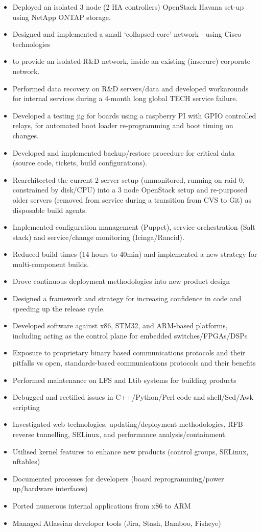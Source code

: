 \begin{itemize}
\itemsep1pt\parskip0pt
\item
  Deployed an isolated 3 node (2 HA controllers) OpenStack Havana set-up
  using NetApp ONTAP storage.
\item
  Designed and implemented a small `collapsed-core' network - using
  Cisco technologies
\item
  to provide an isolated R\&D network, inside an existing (insecure)
  corporate network.
\item
  Performed data recovery on R\&D servers/data and developed workarounds
  for internal services during a 4-month long global TECH service
  failure.
\item
  Developed a testing jig for boards using a raspberry PI with GPIO
  controlled relays, for automated boot loader re-programming and boot
  timing on changes.
\item
  Developed and implemented backup/restore procedure for critical data
  (source code, tickets, build configurations).
\item
  Rearchitected the current 2 server setup (unmonitored, running on raid
  0, constrained by disk/CPU) into a 3 node OpenStack setup and
  re-purposed older servers (removed from service during a transition
  from CVS to Git) as disposable build agents.
\item
  Implemented configuration management (Puppet), service orchestration
  (Salt stack) and service/change monitoring (Icinga/Rancid).
\item
  Reduced build times (14 hours to 40min) and implemented a new strategy
  for multi-component builds.
\item
  Drove continuous deployment methodologies into new product design
\item
  Designed a framework and strategy for increasing confidence in code
  and speeding up the release cycle.
\item
  Developed software against x86, STM32, and ARM-based platforms,
  including acting as the control plane for embedded switches/FPGAs/DSPs
\item
  Exposure to proprietary binary based communications protocols and
  their pitfalls vs open, standards-based communications protocols and
  their benefits
\item
  Performed maintenance on LFS and Ltib systems for building products
\item
  Debugged and rectified issues in C++/Python/Perl code and
  shell/Sed/Awk scripting
\item
  Investigated web technologies, updating/deployment methodologies, RFB
  reverse tunnelling, SELinux, and performance analysis/containment.
\item
  Utilised kernel features to enhance new products (control groups,
  SELinux, nftables)
\item
  Documented processes for developers (board reprogramming/power
  up/hardware interfaces)
\item
  Ported numerous internal applications from x86 to ARM
\item
  Managed Atlassian developer tools (Jira, Stash, Bamboo, Fisheye)
\end{itemize}

